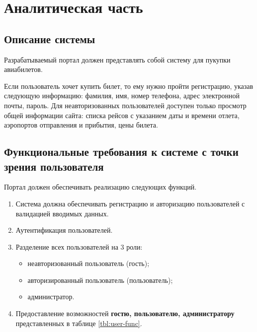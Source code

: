 \chapter{Аналитическая часть}

\section{Описание системы}
Разрабатываемый портал должен представлять собой систему для пукупки авиабилетов. 

Если пользователь хочет купить билет, то ему нужно пройти регистрацию, указав следующую информацию: фамилия, имя, номер телефона, адрес электронной почты, пароль. Для неавторизованных пользователей доступен только просмотр общей информации сайта: списка рейсов с указанием даты и времени отлета, аэропортов отправления и прибытия, цены билета.


\section{Функциональные требования к системе с точки зрения пользователя}
Портал должен обеспечивать реализацию следующих функций.

\begin{enumerate}
    \item Система должна обеспечивать регистрацию и авторизацию пользователей с валидацией вводимых данных.
    \item Аутентификация пользователей.
    \item Разделение всех пользователей на 3 роли:
    \begin{itemize}
      \item неавторизованный пользователь (гость);
	    \item авторизированный пользователь (пользователь);
		  \item администратор.
	\end{itemize}

  \item Предоставление возможностей \textbf{гостю, пользователю, администратору} представленных в таблице \ref{tbl:user-func}.
\end{enumerate}

